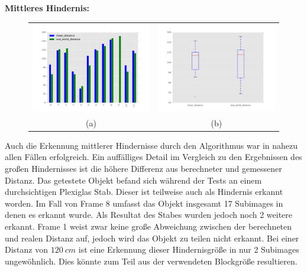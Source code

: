 	\noindent
	\textbf{Mittleres Hindernis:}\\
	\begin{figure}[h]
		\centering
		\begin{tabular}{cc}
		\includegraphics[width=7cm]{img/evaluation/sub_medium_bar}&
		\includegraphics[width=7cm]{img/evaluation/sub_medium_box}\\
		(a) &  (b)
		\end{tabular}
	    \caption{}
	    \label{fig:eval_medium}
	\end{figure}
	
	\noindent
	Auch die Erkennung mittlerer Hindernisse durch den Algorithmus war in nahezu allen Fällen erfolgreich. Ein auffälliges Detail im Vergleich zu den Ergebnissen des großen Hindernisses ist die höhere Differenz aus berechneter und gemessener Distanz. Das getestete Objekt befand sich während der Tests an einem durchsichtigen Plexiglas Stab. Dieser ist teilweise auch als Hindernis erkannt worden. Im Fall von Frame 8 umfasst das Objekt insgesamt 17 Subimages in denen es erkannt wurde. Als Resultat des Stabes wurden jedoch noch 2 weitere erkannt. Frame 1 weist zwar keine große Abweichung zwischen der berechneten und realen Distanz auf, jedoch wird das Objekt zu teilen nicht erkannt. Bei einer Distanz von $120\ cm$ ist eine Erkennung dieser Hindernisgröße in nur 2 Subimages ungewöhnlich. Dies könnte zum Teil aus der verwendeten Blockgröße resultieren.
	
